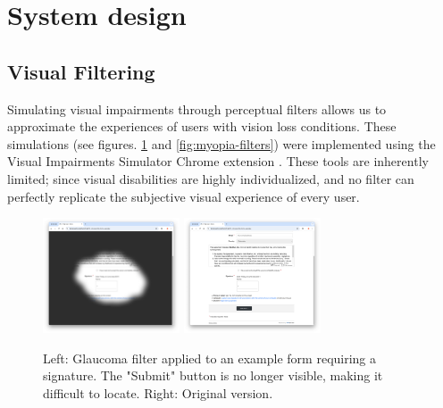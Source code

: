 
\section{System design}
\subsection{Visual Filtering}

Simulating visual impairments through perceptual filters allows us to approximate the experiences of users with vision loss conditions. These simulations (see figures. \ref{fig:glaucoma-filters} and \ref{fig:myopia-filters}) were implemented using the Visual Impairments Simulator Chrome extension \cite{visual_impairments_simulator}. These tools are inherently limited; since visual disabilities are highly individualized, and no filter can perfectly replicate the subjective visual experience of every user.

\begin{figure}
    \centering
    \includegraphics[width=115pt]{imgs/glaucoma-filter.png}
    \includegraphics[width=115pt]{imgs/no-glaucoma-filter.png}
    \caption{Left: Glaucoma filter applied to an example form requiring a signature. The "Submit" button is no longer visible, making it difficult to locate. Right: Original version.}
    \vspace{-13pt}
    \label{fig:glaucoma-filters}
\end{figure}

